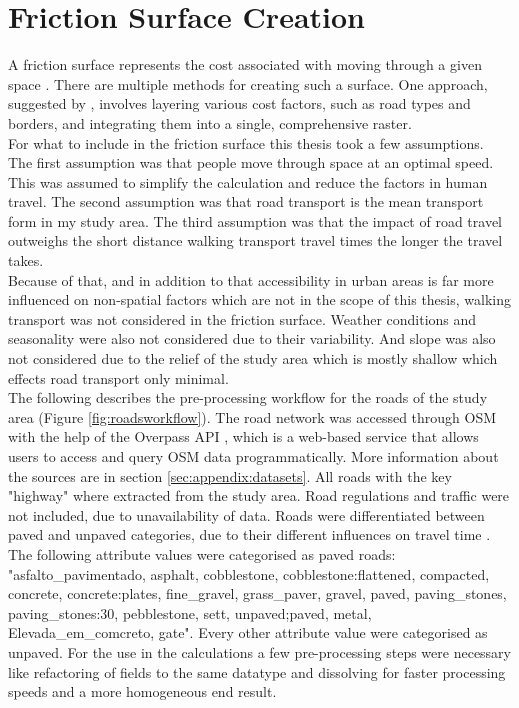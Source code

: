\documentclass[11pt, a4paper]{report}
\begin{document}
\section{Friction Surface Creation}\label{sec:method:frictionsurface}
A friction surface represents the cost associated with moving through a given space \citep{carrothers_historical_1956}. There are multiple methods for creating such a surface. One approach, suggested by \citet{weiss_global_2020}, involves layering various cost factors, such as road types and borders, and integrating them into a single, comprehensive raster. \\
%
For what to include in the friction surface this thesis took a few assumptions. The first assumption was that people move through space at an optimal speed. This was assumed to simplify the calculation and reduce the factors in human travel. The second assumption was that road transport is the mean transport form in my study area. The third assumption was that the impact of road travel outweighs the short distance walking transport travel times the longer the travel takes. \\
%
Because of that, and in addition to that accessibility in urban areas is far more influenced on non-spatial factors which are not in the scope of this thesis, walking transport was not considered in the friction surface. Weather conditions and seasonality were also not considered due to their variability. And slope was also not considered due to the relief of the study area which is mostly shallow which effects road transport only minimal. \\
%
The following describes the pre-processing workflow for the roads of the study area (Figure \ref{fig:roadsworkflow}). The road network was accessed through OSM with the help of the Overpass  API \citep{olbricht_drolbroverpass-api_2024}, which is a web-based service that allows users to access and query OSM data programmatically. More information about the sources are in section \ref{sec:appendix:datasets}. All roads with the key "highway" where extracted from the study area. Road regulations and traffic were not included, due to unavailability of data. Roads were differentiated between paved and unpaved categories, due to their different influences on travel time \citep{weiss_global_2018}. The following attribute values were categorised as paved roads: "asfalto\_pavimentado, asphalt, cobblestone, cobblestone:flattened, compacted, concrete, concrete:plates, fine\_gravel, grass\_paver, gravel, paved, paving\_stones, paving\_stones:30, pebblestone, sett, unpaved;paved, metal, Elevada\_em\_comcreto, gate". Every other attribute value were categorised as unpaved. For the use in the calculations a few pre-processing steps were necessary like refactoring of fields to the same datatype and dissolving for faster processing speeds and a more homogeneous end result.
\end{document}
